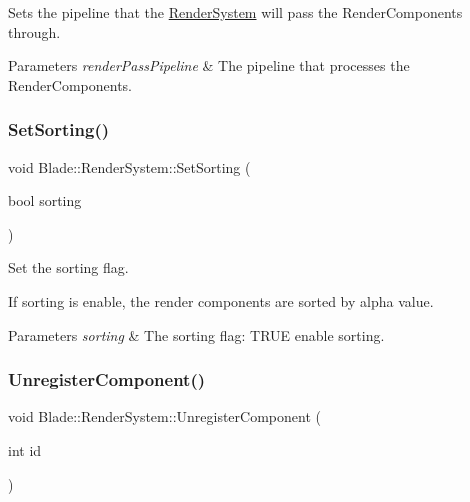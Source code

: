 Sets the pipeline that the \hyperlink{class_blade_1_1_render_system}{Render\+System} will pass the Render\+Components through. 


\begin{DoxyParams}{Parameters}
{\em render\+Pass\+Pipeline} & The pipeline that processes the Render\+Components. \\
\hline
\end{DoxyParams}
\mbox{\label{class_blade_1_1_render_system_a6bbc18b56812347c4960336f5d15effa}} 
\subsubsection{\texorpdfstring{Set\+Sorting()}{SetSorting()}}
{\footnotesize\ttfamily void Blade\+::\+Render\+System\+::\+Set\+Sorting (\begin{DoxyParamCaption}\item[{bool}]{sorting }\end{DoxyParamCaption})\hspace{0.3cm}{\ttfamily [noexcept]}}



Set the sorting flag. 

If sorting is enable, the render components are sorted by alpha value. 
\begin{DoxyParams}{Parameters}
{\em sorting} & The sorting flag\+: T\+R\+UE enable sorting. \\
\hline
\end{DoxyParams}
\mbox{\label{class_blade_1_1_render_system_afaaca8d329f9fa9903a28202959f8958}} 
\subsubsection{\texorpdfstring{Unregister\+Component()}{UnregisterComponent()}}
{\footnotesize\ttfamily void Blade\+::\+Render\+System\+::\+Unregister\+Component (\begin{DoxyParamCaption}\item[{int}]{id }\end{DoxyParamCaption})\hspace{0.3cm}{\ttfamily [noexcept]}}



